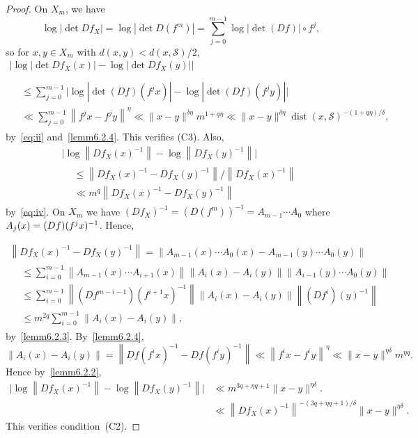 \documentclass[10pt]{amsart}
\theoremstyle{definition}\newtheorem{defi}[theo]{Definition}\newtheorem{rema}[theo]{Remark}\newtheorem{exam}[theo]{Example}\newtheorem{exem}[theo]{Example}\newtheorem{nota}[theo]{Notation}
\newcommand{\cS}{\mathcal{S}}
\DeclareMathOperator{\dist}{dist}
\begin{document}
\begin{proof}
On $X_m$, we have
\[
\log\left|\det Df_X\right|=\log\left|\det D(f^m)\right| =\sum_{j=0}^{m-1}\log\left|\det(Df)\right|\circ f^j,
\]
so for $x,y\in X_m$ with $d(x,y)<d(x,\cS)/2$,
\begin{multline*}
\big|\log\left|\det Df_X(x)\right| -\log\left|\det Df_X(y)\right|\big|\\
\begin{aligned}
\\ & \le
\sum_{j=0}^{m-1}\Big|\log\left|\det (Df)(f^jx)\right|- \log\left|\det (Df)(f^jy)\right|\Big|
\\ & \ll \sum_{j=0}^{m-1}\left\|f^jx-f^jy\right\|^\eta
\ll \|x-y\|^{\delta\eta}m^{1+q\eta}
\ll \|x-y\|^{\delta\eta}\dist(x,\cS)^{-(1+q\eta)/\delta},
\end{aligned}
\end{multline*}
by~\eqref{eq:ii} and~\eqref{lemm6.2.4}. This verifies (C3). Also,
\begin{multline*}
\Big|\log\left\|Df_X(x)^{-1}\right\|- \log\left\|Df_X(y)^{-1}\right\|\Big|\\
\begin{aligned}
& \le \left\|Df_X(x)^{-1}-Df_X(y)^{-1}\right\|/\left\|Df_X(x)^{-1}\right\|
\\ & \ll m^q \left\|Df_X(x)^{-1}-Df_X(y)^{-1}\right\|
\end{aligned}
\end{multline*}
by~\eqref{eq:iv}. On $X_m$ we have $(Df_X)^{-1}=(D(f^m))^{-1} =A_{m-1}\cdots A_0$ where $A_j(x)\linebreak=(Df)(f^jx)^{-1}$. Hence,


\begin{multline*}
\left\|Df_X(x)^{-1}- Df_X(y)^{-1}\right\| =\left\|A_{m-1}(x)\cdots A_0(x)- A_{m-1}(y)\cdots A_0(y)\right\|\\
\begin{aligned}
&\le\sum_{i=0}^{m-1}\left\|A_{m-1}(x)\cdots A_{i+1}(x)\right\|
\left\|A_i(x)-A_i(y)\right\|
\left\|A_{i-1}(y)\cdots A_0(y)\right\|
\\ &
\le\sum_{i=0}^{m-1}\left\|\left(Df^{m-i-1}\right)\left(f^{i+1}x\right)^{-1}\right\|
\left\|A_i(x)-A_i(y)\right\|
\left\|(Df^i)(y)^{-1}\right\|
\\ & \le m^{2q}\sum_{i=0}^{m-1}
\left\|A_i(x)-A_i(y)\right\|,
\end{aligned}
\end{multline*}
by~\eqref{lemm6.2.3}. By~\eqref{lemm6.2.4},
\[
\left\|A_i(x)-A_i(y)\right\|=\left\|Df(f^ix)^{-1}-Df(f^iy)^{-1}\right\|
\ll \left\|f^ix-f^iy\right\|^\eta\ll \|x-y\|^{\eta\delta}m^{\eta q}.
\]
Hence by~\eqref{lemm6.2.2},
\begin{align*}
\big|\log\left\|Df_X(x)^{-1}\right\|- \log\left\|Df_X(y)^{-1}\right\|\big| & \ll m^{3q+\eta q+1} \|x-y\|^{\eta \delta}.
\\ & \ll \left\|Df_X(x)^{-1}\right\|^{-\left(3q+\eta q+1\right)/\delta} \|x-y\|^{\eta \delta}.
\end{align*}
This verifies condition~(C2).


\end{proof}
\end{document}
